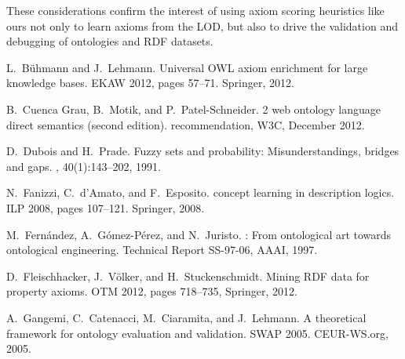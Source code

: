 \documentclass{sig-alternate}
\begin{document}



These considerations confirm the interest of using axiom scoring heuristics like ours
not only to learn axioms from the LOD, but also to drive the validation and debugging of ontologies and RDF datasets.

%
%
%
%
\begin{thebibliography}{10}

L.~B{\"u}hmann and J.~Lehmann.
\newblock Universal {OWL} axiom enrichment for large knowledge bases.
\newblock EKAW 2012, pages
  57--71. Springer, 2012.

B.~{Cuenca Grau}, B.~Motik, and P.~{Patel-Schneider}.
 2 web ontology language direct semantics (second edition).
 recommendation, W3C, December 2012.

D.~Dubois and H.~Prade.
\newblock Fuzzy sets and probability: Misunderstandings, bridges and gaps.
, 40(1):143--202, 1991.

N.~Fanizzi, C.~d'Amato, and F.~Esposito.
 concept learning in description logics.
\newblock ILP 2008, pages 107--121. Springer, 2008.

M.~Fern\'andez, A.~G\'omez-P\'erez, and N.~Juristo.
: From ontological art towards ontological engineering.
\newblock Technical Report SS-97-06, AAAI, 1997.

D.~Fleischhacker, J.~V{\"o}lker, and H.~Stuckenschmidt.
\newblock Mining {RDF} data for property axioms.
\newblock OTM 2012, pages 718--735, Springer, 2012.

A.~Gangemi, C.~Catenacci, M.~Ciaramita, and J.~Lehmann.
\newblock A theoretical framework for ontology evaluation and validation.
\newblock SWAP 2005. CEUR-WS.org, 2005.


\end{thebibliography}
\end{document}
